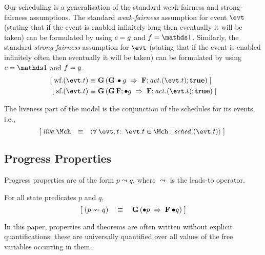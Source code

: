 Our scheduling is a generalisation of the standard weak-fairness and
strong-fairness assumptions. The standard \emph{weak-fairness}
assumption for event $\evt$ (stating that if the event is enabled
infinitely long then eventually it will be taken) can be formulated
by using $c = g$ and $\fsched = \one$.
Similarly, the standard \emph{strong-fairness} assumption for $\evt$
(stating that if the event is enabled infinitely often then eventually
it will be taken) can be formulated by using $\csched = \one$ and
$f = g$.
\begin{align}
  \ew{ \wf.(\evt.t)  &\equiv \G (\G \bullet \guard \1\implies
    \F;\action.(\evt.t);\ctrue) } \\
  \ew{ \strf.(\evt.t)  &\equiv \G (\G \F;\bullet \guard \1\implies \F;\action.(\evt.t);\ctrue) }
\end{align}



The liveness part of the model is the conjunction of the schedules for its
events, i.e.,
\begin{equation}
  \label{eq:liveness}
  \ew{\liveness.\Mch \Wide{\eqv} \qforall{\evt, t}{\evt.t \in \Mch}{\schedule.(\evt.t)}}~
\end{equation}


\subsection{Progress Properties}
\label{sec:progress-properties}
Progress properties are of the form $p \leadsto q$, where
$\leadsto$ is the leads-to operator.
\begin{Definition} For all state predicates $p$
  and $q$,
  \begin{equation}
    \label{eq:leadsto}
    [\; (p \leadsto q) ~~~\equiv~~~ \mathbf{G}\, (\bullet p ~\mathbin\Rightarrow~ \mathbf{F} \bullet \! q)  \;]
  \end{equation}
\end{Definition}
In this paper, properties and theorems are often written without
explicit quantifications: these are universally quantified over all
values of the free variables occurring in them.

